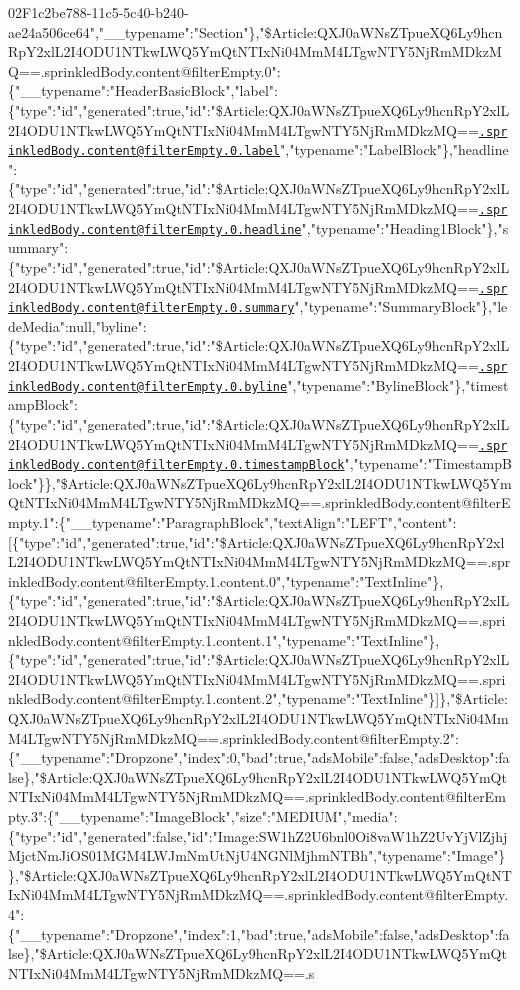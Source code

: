 02F1c2be788-11c5-5c40-b240-ae24a506ce64","\_\_typename":"Section"\},"\$Article:QXJ0aWNsZTpueXQ6Ly9hcnRpY2xlL2I4ODU1NTkwLWQ5YmQtNTIxNi04MmM4LTgwNTY5NjRmMDkzMQ==.sprinkledBody.content@filterEmpty.0":\{"\_\_typename":"HeaderBasicBlock","label":\{"type":"id","generated":true,"id":"\$Article:QXJ0aWNsZTpueXQ6Ly9hcnRpY2xlL2I4ODU1NTkwLWQ5YmQtNTIxNi04MmM4LTgwNTY5NjRmMDkzMQ==\href{mailto:.sprinkledBody.content@filterEmpty.0.label}{\nolinkurl{.sprinkledBody.content@filterEmpty.0.label}}","typename":"LabelBlock"\},"headline":\{"type":"id","generated":true,"id":"\$Article:QXJ0aWNsZTpueXQ6Ly9hcnRpY2xlL2I4ODU1NTkwLWQ5YmQtNTIxNi04MmM4LTgwNTY5NjRmMDkzMQ==\href{mailto:.sprinkledBody.content@filterEmpty.0.headline}{\nolinkurl{.sprinkledBody.content@filterEmpty.0.headline}}","typename":"Heading1Block"\},"summary":\{"type":"id","generated":true,"id":"\$Article:QXJ0aWNsZTpueXQ6Ly9hcnRpY2xlL2I4ODU1NTkwLWQ5YmQtNTIxNi04MmM4LTgwNTY5NjRmMDkzMQ==\href{mailto:.sprinkledBody.content@filterEmpty.0.summary}{\nolinkurl{.sprinkledBody.content@filterEmpty.0.summary}}","typename":"SummaryBlock"\},"ledeMedia":null,"byline":\{"type":"id","generated":true,"id":"\$Article:QXJ0aWNsZTpueXQ6Ly9hcnRpY2xlL2I4ODU1NTkwLWQ5YmQtNTIxNi04MmM4LTgwNTY5NjRmMDkzMQ==\href{mailto:.sprinkledBody.content@filterEmpty.0.byline}{\nolinkurl{.sprinkledBody.content@filterEmpty.0.byline}}","typename":"BylineBlock"\},"timestampBlock":\{"type":"id","generated":true,"id":"\$Article:QXJ0aWNsZTpueXQ6Ly9hcnRpY2xlL2I4ODU1NTkwLWQ5YmQtNTIxNi04MmM4LTgwNTY5NjRmMDkzMQ==\href{mailto:.sprinkledBody.content@filterEmpty.0.timestampBlock}{\nolinkurl{.sprinkledBody.content@filterEmpty.0.timestampBlock}}","typename":"TimestampBlock"\}\},"\$Article:QXJ0aWNsZTpueXQ6Ly9hcnRpY2xlL2I4ODU1NTkwLWQ5YmQtNTIxNi04MmM4LTgwNTY5NjRmMDkzMQ==.sprinkledBody.content@filterEmpty.1":\{"\_\_typename":"ParagraphBlock","textAlign":"LEFT","content":{[}\{"type":"id","generated":true,"id":"\$Article:QXJ0aWNsZTpueXQ6Ly9hcnRpY2xlL2I4ODU1NTkwLWQ5YmQtNTIxNi04MmM4LTgwNTY5NjRmMDkzMQ==.sprinkledBody.content@filterEmpty.1.content.0","typename":"TextInline"\},\{"type":"id","generated":true,"id":"\$Article:QXJ0aWNsZTpueXQ6Ly9hcnRpY2xlL2I4ODU1NTkwLWQ5YmQtNTIxNi04MmM4LTgwNTY5NjRmMDkzMQ==.sprinkledBody.content@filterEmpty.1.content.1","typename":"TextInline"\},\{"type":"id","generated":true,"id":"\$Article:QXJ0aWNsZTpueXQ6Ly9hcnRpY2xlL2I4ODU1NTkwLWQ5YmQtNTIxNi04MmM4LTgwNTY5NjRmMDkzMQ==.sprinkledBody.content@filterEmpty.1.content.2","typename":"TextInline"\}{]}\},"\$Article:QXJ0aWNsZTpueXQ6Ly9hcnRpY2xlL2I4ODU1NTkwLWQ5YmQtNTIxNi04MmM4LTgwNTY5NjRmMDkzMQ==.sprinkledBody.content@filterEmpty.2":\{"\_\_typename":"Dropzone","index":0,"bad":true,"adsMobile":false,"adsDesktop":false\},"\$Article:QXJ0aWNsZTpueXQ6Ly9hcnRpY2xlL2I4ODU1NTkwLWQ5YmQtNTIxNi04MmM4LTgwNTY5NjRmMDkzMQ==.sprinkledBody.content@filterEmpty.3":\{"\_\_typename":"ImageBlock","size":"MEDIUM","media":\{"type":"id","generated":false,"id":"Image:SW1hZ2U6bnl0Oi8vaW1hZ2UvYjVlZjhjMjctNmJiOS01MGM4LWJmNmUtNjU4NGNlMjhmNTBh","typename":"Image"\}\},"\$Article:QXJ0aWNsZTpueXQ6Ly9hcnRpY2xlL2I4ODU1NTkwLWQ5YmQtNTIxNi04MmM4LTgwNTY5NjRmMDkzMQ==.sprinkledBody.content@filterEmpty.4":\{"\_\_typename":"Dropzone","index":1,"bad":true,"adsMobile":false,"adsDesktop":false\},"\$Article:QXJ0aWNsZTpueXQ6Ly9hcnRpY2xlL2I4ODU1NTkwLWQ5YmQtNTIxNi04MmM4LTgwNTY5NjRmMDkzMQ==.s